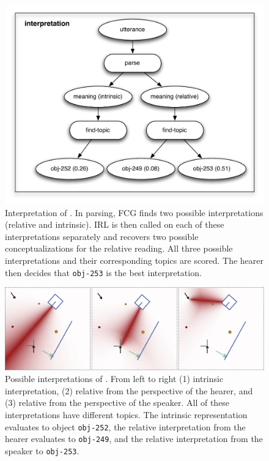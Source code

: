\begin{figure}[p]
\begin{center}
\includegraphics[width=0.5\columnwidth]{figs/semantic-ambiguity-interpretation}
\end{center}
\caption[Interpretation example schematic]{%
Interpretation of . In parsing,
FCG finds two possible interpretations (relative and intrinsic). IRL is then called 
on each of these interpretations separately and recovers 
two possible conceptualizations for the relative reading. All three
possible interpretations and their corresponding topics are scored. 
The hearer then decides that {\footnotesize\tt obj-253} is the best interpretation.}
\label{f:processing-interpretations}
\end{figure}
\clearpage
\begin{figure}[t]
\begin{center}
\includegraphics[width=0.95\columnwidth]{figs/semantic-ambiguity-interpretations.png}
\end{center}
\caption[Interpretation example graphic]{Possible interpretations of .
From left to right (1) intrinsic interpretation, (2) relative from the perspective of the hearer,
and (3) relative from the perspective of the speaker. All of these interpretations have
different topics. The intrinsic representation evaluates to object {\footnotesize\tt obj-252},
the relative interpretation from the hearer evaluates to {\footnotesize\tt obj-249}, and
the relative interpretation from the speaker to {\footnotesize\tt obj-253}.}
\label{f:interpretations}
\end{figure}


